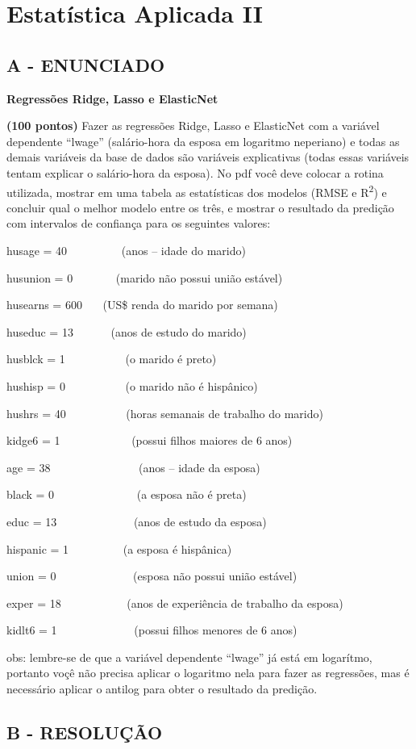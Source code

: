 \label{ap:ap04}
\chapter{Estatística Aplicada II}
\section*{\textbf{A - ENUNCIADO}}

\textbf{Regressões Ridge, Lasso e ElasticNet}


\bigskip

\textbf{(100 pontos) }Fazer as regressões Ridge, Lasso e ElasticNet com a variável dependente “lwage” (salário-hora da
esposa em logaritmo neperiano) e todas as demais variáveis da base de dados são variáveis explicativas (todas essas
variáveis tentam explicar o salário-hora da esposa). No pdf você deve colocar a rotina utilizada, mostrar em uma tabela
as estatísticas dos modelos (RMSE e R\textsuperscript{2}) e concluir qual o melhor modelo entre os três, e mostrar o
resultado da predição com intervalos de confiança para os seguintes valores:

husage = 40 \ \ \ \ \ \ \ \ \ (anos – idade do marido)

husunion = 0 \ \ \ \ \ \ \ (marido não possui união estável)

husearns = 600 \ \ \ (US\$ renda do marido por semana)

huseduc = 13 \ \ \ \ \ \ (anos de estudo do marido)

husblck = 1 \ \ \ \ \ \ \ \ \ \ (o marido é preto)

hushisp = 0 \ \ \ \ \ \ \ \ \ \ (o marido não é hispânico)

hushrs = 40 \ \ \ \ \ \ \ \ \ \ (horas semanais de trabalho do marido)

kidge6 = 1 \ \ \ \ \ \ \ \ \ \ \ \ (possui filhos maiores de 6 anos)

age = 38 \ \ \ \ \ \ \ \ \ \ \ \ \ \ \ (anos – idade da esposa)

black = 0 \ \ \ \ \ \ \ \ \ \ \ \ \ \ (a esposa não é preta)

educ = 13 \ \ \ \ \ \ \ \ \ \ \ \ \ (anos de estudo da esposa)

hispanic = 1 \ \ \ \ \ \ \ \ \ (a esposa é hispânica)

union = 0 \ \ \ \ \ \ \ \ \ \ \ \ \ (esposa não possui união estável)

exper = 18 \ \ \ \ \ \ \ \ \ \ \ (anos de experiência de trabalho da esposa)

kidlt6 = 1 \ \ \ \ \ \ \ \ \ \ \ \ \ (possui filhos menores de 6 anos)


\bigskip

obs: lembre-se de que a variável dependente “lwage” já está em logarítmo, portanto voçê não precisa aplicar o logaritmo
nela para fazer as regressões, mas é necessário aplicar o antilog para obter o resultado da predição. 


\section*{\textbf{B - RESOLUÇÃO}}
\lipsum[30]